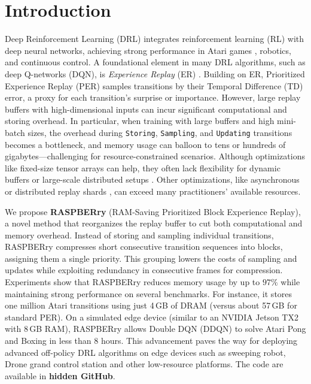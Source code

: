 \documentclass[10pt]{article} %
\begin{document}
\section{Introduction}\label{sec:intro}
Deep Reinforcement Learning (DRL) integrates reinforcement learning (RL) with deep neural networks, achieving strong performance in Atari games \citep{HumanlevelControlDeep_mnih_2015}, robotics, and continuous control.
A foundational element in many DRL algorithms, such as deep Q-networks (DQN), is \emph{Experience Replay} (ER) \citep{SelfimprovingReactiveAgents_lin_1992}. 
Building on ER, Prioritized Experience Replay (PER) \citep{GeneralizedPrioritizedSweeping_andre_1997, PrioritizedExperienceReplay_schaul_2016} samples transitions by their Temporal Difference (TD) error, a proxy for each transition's surprise or importance.
However, large replay buffers with high-dimensional inputs can incur significant computational and storing overhead.  
In particular, when training with large buffers and high mini-batch sizes, the overhead during \texttt{Storing}, \texttt{Sampling}, and \texttt{Updating} transitions becomes a bottleneck, and memory usage can balloon to tens or hundreds of gigabytes---challenging for resource-constrained scenarios.  
Although optimizations like fixed-size tensor arrays \citep{CurtParkRainbowisallyouneed_parkcurt_2024, StableBaselines3ReliableReinforcement_raffin_2021} can help, they often lack flexibility for dynamic buffers or large-scale distributed setups \citep{RayDistributedFramework_moritz_2018}. 
Other optimizations, like asynchronous or distributed replay shards \citep{RayDistributedFramework_moritz_2018}, can exceed many practitioners' available resources.

We propose \textbf{RASPBERry} (RAM-Saving Prioritized Block Experience Replay), a novel method that reorganizes the replay buffer to cut both computational and memory overhead.
Instead of storing and sampling individual transitions, RASPBERry compresses short consecutive transition sequences into blocks, assigning them a single priority.
This grouping lowers the costs of sampling and updates while exploiting redundancy in consecutive frames for compression.
Experiments show that RASPBERry reduces memory usage by up to $97\%$ while maintaining strong performance on several benchmarks.
For instance, it stores one million Atari transitions using just 4\,GB of DRAM (versus about 57\,GB for standard PER).  
On a simulated edge device (similar to an NVIDIA Jetson TX2 \citep{JetsonTX2Module_nvidiadeveloper_2024} with 8\,GB RAM), RASPBERry allows Double DQN (DDQN) to solve Atari Pong and Boxing in less than 8 hours.
This advancement paves the way for deploying advanced off-policy DRL algorithms on edge devices such as sweeping robot, Drone grand control station and other low-resource platforms.
The code are available in \textbf{hidden GitHub}.
\end{document}
